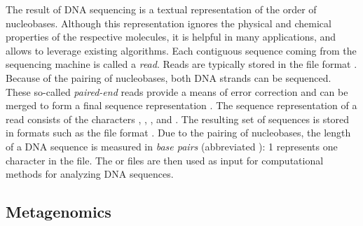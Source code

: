 The result of \ac{DNA} sequencing is a textual representation of the order of nucleobases.
Although this representation ignores the physical and chemical properties of the respective molecules,
it is helpful in many applications, and allows to leverage existing algorithms.
Each contiguous sequence coming from the sequencing machine is called a \emph{read}.
Reads are typically stored in the  file format \cite{Cock2009}.
Because of the pairing of nucleobases, both \ac{DNA} strands can be sequenced.
These so-called \emph{paired-end} reads provide a means of error correction
and can be merged to form a final sequence representation \cite{Zhang2014}.
The sequence representation of a read consists of
the characters , , , and .
The resulting set of sequences is stored in formats such as the  file format \cite{Pearson1988}.
Due to the pairing of nucleobases,
the length of a \ac{DNA} sequence is measured in \emph{base pairs} (abbreviated \si{\basepair}):
\SI{1}{\basepair} represents one character in the file.
The  or  files are then used as input
for computational methods for analyzing \ac{DNA} sequences.



\subsection{Metagenomics}
\label{ch:Foundations:sec:SequenceAnalysis:sub:Metagenomics}

